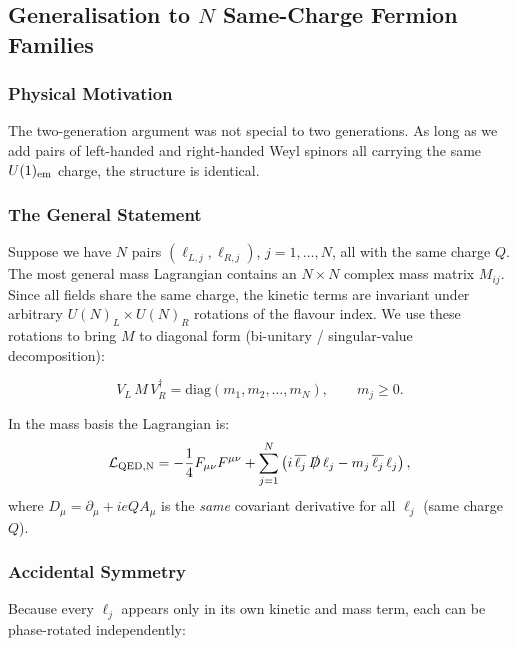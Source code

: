\documentclass[../main.tex]{subfiles}
\begin{document}
\subsection*{Generalisation to $N$ Same-Charge Fermion Families}\label{sec:lec12:nfam}

\subsubsection*{Physical Motivation}

The two-generation argument was not special to two generations.  As long as we add pairs of left-handed and right-handed Weyl spinors all carrying the same $U(1)_{\rm em}$ charge, the structure is identical.

\subsubsection*{The General Statement}

Suppose we have $N$ pairs $(\ell_{L,j}, \ell_{R,j})$, $j=1,\ldots,N$, all with the same charge $Q$.  The most general mass Lagrangian contains an $N\times N$ complex mass matrix $M_{ij}$.  Since all fields share the same charge, the kinetic terms are invariant under arbitrary $U(N)_L\times U(N)_R$ rotations of the flavour index.  We use these rotations to bring $M$ to diagonal form (bi-unitary / singular-value decomposition):

\begin{equation}
  \boxed{
  V_L\,M\,V_R^\dagger = \mathrm{diag}(m_1, m_2, \ldots, m_N),
  \qquad m_j \geq 0.}
  \label{eq:lec12:diagN}
\end{equation}

In the mass basis the Lagrangian is:
\begin{equation}
  \mathcal{L}_{\rm QED,N}
  =
  -\frac{1}{4}F_{\mu\nu}F^{\mu\nu}
  + \sum_{j=1}^{N}
    \left(i\,\overline{\ell_j}\,\slashed{D}\,\ell_j - m_j\,\overline{\ell_j}\,\ell_j\right),
  \label{eq:lec12:lagN}
\end{equation}
where $D_\mu = \partial_\mu + ieQA_\mu$ is the \emph{same} covariant derivative for all $\ell_j$ (same charge $Q$).

\subsubsection*{Accidental Symmetry}

Because every $\ell_j$ appears only in its own kinetic and mass term, each can be phase-rotated independently:
\end{document}
